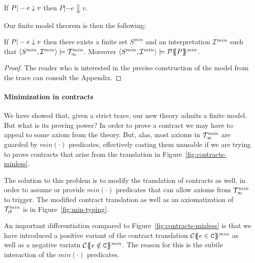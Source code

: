 \begin{lemma}
If $P |- e \downarrow v$ then $P |- e \Downarrow v$.
\end{lemma} 

Our finite model theorem is then the following:

\begin{theorem}\label{thm:finite-model} If $P |- e \downarrow v$ then there exists 
a finite set $S^{min}$ and an interpretation ${\cal I}^{min}$ such that 
$\langle S^{min},{\cal I}^{min}\rangle \models {\cal T}_{\infty}^{min}$. Moreover 
$\langle S^{min},{\cal I}^{min}\rangle \models {\cal P}\{\!\!\{P\}\!\!\}^{min}$. 
\end{theorem}
\begin{proof} The reader who is interested in the precise 
construction of the model from the trace can consult the 
Appendix. 
\end{proof}

\paragraph{Minimization in contracts}
\newcommand{\ctransmin}[3]{\ctrans{#1}{#2}{#3}^{min}} 
\newcommand{\calI}{{\cal J}}

We have showed that, given a strict trace, our new theory admits a finite model. But what is its proving 
power? In order to prove a contract we may have to appeal to some axiom from the theory. But, alas, most
axioms in ${\cal T}_{\infty}^{min}$ are guarded by $min(\cdot)$ predicates, effectively casting them unusable if we are 
trying to prove contracts that arise from the translation in Figure~\ref{fig:contracts-minless}.

The solution to this problem is to modify the translation of contracts as well, in order to assume 
or provide $min(\cdot)$ predicates that can allow axioms from ${\cal T}_{\infty}^{min}$ to trigger. The modified 
contract translation as well as an axiomatization of ${\cal T}_{\textsf{cf}}^{min}$ is in Figure~\ref{fig:min-typing}.

An important differentiation compared to Figure~\ref{fig:contracts-minless} is that we have introduced
a positive variant of the contract translation $\ctransmin{}{\Gamma}{e \in \Ct}$ as well as a 
negative variatn $\ctransmin{}{\Gamma}{e \notin \Ct}$. The reason for this is the subtle interaction of
the $min(\cdot)$ predicates. 

